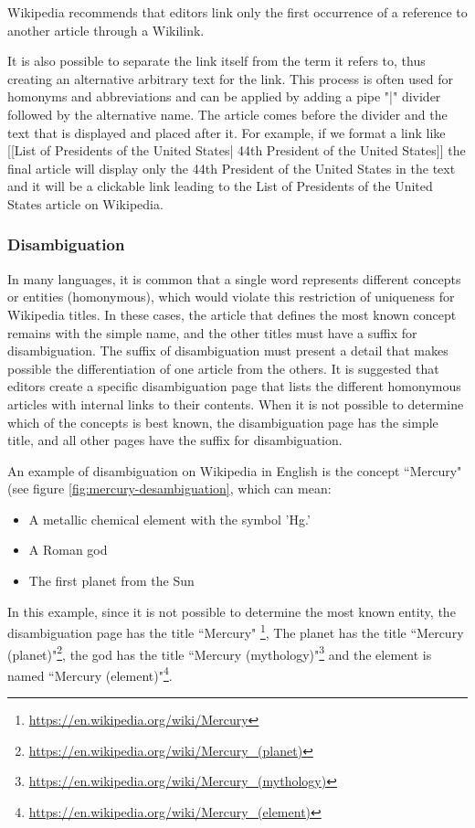 Wikipedia recommends that editors link only the first occurrence of a reference to another article through a Wikilink. 

It is also possible to separate the link itself from the term it refers to, thus creating an alternative arbitrary text for the link. This process is often used for homonyms and abbreviations and can be applied by adding a pipe "|" divider followed by the alternative name. The article comes before the divider and the text that is displayed and placed after it.  For example, if we format a link like [[List of Presidents of the United States| 44th President of the United States]] the final article will display only the 44th President of the United States in the text and it will be a clickable link leading to the List of Presidents of the United States article on Wikipedia. 

\subsubsection{\hspace*{3pt}Disambiguation}

In many languages, it is common that a single word represents different concepts or entities (homonymous), which would violate this restriction of uniqueness for Wikipedia titles. In these cases, the article that defines the most known concept remains with the simple name, and the other titles must have a suffix for disambiguation. The suffix of disambiguation must present a detail that makes possible the differentiation of one article from the others. It is suggested that editors create a specific disambiguation page that lists the different homonymous articles with internal links to their contents. When it is not possible to determine which of the concepts is best known, the disambiguation page has the simple title, and all other pages have the suffix for disambiguation.


An example of disambiguation on Wikipedia in English is the concept ``Mercury" (see figure \ref{fig:mercury-desambiguation}, which can mean:

 \begin {itemize}
 \item A metallic chemical element with the symbol 'Hg.'
 \item A Roman god
 \item The first planet from the Sun
 \end {itemize}


 In this example, since it is not possible to determine the most known entity,  the disambiguation page has the title ``Mercury" \footnote{\url{https://en.wikipedia.org/wiki/Mercury}}, The planet has the title ``Mercury (planet)"\footnote{\url{https://en.wikipedia.org/wiki/Mercury_(planet)}}, the god has the title ``Mercury (mythology)"\footnote{\url{https://en.wikipedia.org/wiki/Mercury_(mythology)}} and the element is named ``Mercury (element)"\footnote{\url{https://en.wikipedia.org/wiki/Mercury_(element)}}.

